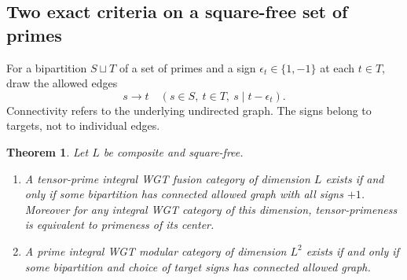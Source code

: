 \documentclass[11pt,a4paper]{article}
\numberwithin{equation}{section}
\newtheorem{theorem}{Theorem}[section]
\theoremstyle{remark}
\begin{document}
\subsection{Two exact criteria on a square-free set of primes}\label{fam:M:sec:13.3}
For a bipartition $S\sqcup T$ of a set of primes and a sign
$\epsilon_t\in\{1,-1\}$ at each $t\in T$, draw the allowed edges
\[
     s\longrightarrow t\quad (s\in S,\ t\in T,\ s\mid t-\epsilon_t).
\]
Connectivity refers to the underlying undirected graph. The signs
belong to targets, not to individual edges.
\begin{theorem}\label{fam:M:13.7}\label{thm:uc-bipartite}
Let $L$ be composite and square-free.
\begin{enumerate}
\item A tensor-prime integral WGT fusion category of dimension $L$
exists if and only if some bipartition has connected allowed graph
with all signs $+1$. Moreover for any integral WGT category of this
dimension, tensor-primeness is equivalent to primeness of its center.
\item A prime integral WGT modular category of dimension
$L^2$ exists if and only if some bipartition and choice of target signs
has connected allowed graph.
\end{enumerate}
\end{theorem}
\end{document}
